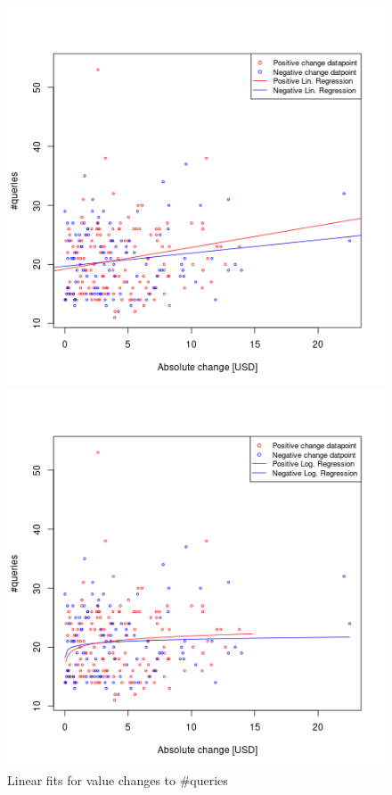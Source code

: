 \documentclass[12pt]{article}
\begin{document}
\begin{figure}[!]
  \includegraphics[width=\linewidth]{linearTrendRegressions.png}
  \caption{Linear fits for value changes to \#queries}\label{fig:linearTrendRegressions}
\endminipage\hfill
{}
  \includegraphics[width=\linewidth]{logTrendRegressions.png}

\end{figure}
\end{document}
